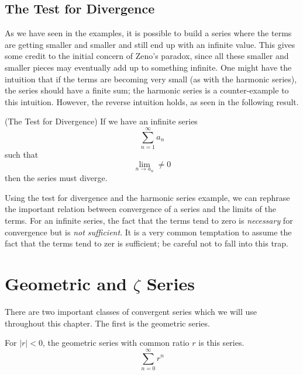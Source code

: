 \documentclass[fleqn]{report}
\begin{document}
\subsection{The Test for Divergence}
\label{test-for-divergence}

As we have seen in the examples, it is possible to
build a series where the terms are getting smaller and smaller
and still end up with an infinite value. This gives some
credit to the initial concern of Zeno's paradox, since all
these smaller and smaller pieces may eventually add up to
something infinite. One might have the intuition that if the
terms are becoming very small (as with the harmonic series),
the series should have a finite sum; the harmonic series is a
counter-example to this intuition. However, the reverse
intuition holds, as seen in the following result.

\begin{prop}(The Test for Divergence)
If we have an infinite series
\begin{equation*}
\sum_{n=1}^\infty a_n
\end{equation*}
such that 
\begin{equation*}
\lim_{n \rightarrow a_n} \neq 0
\end{equation*}
then the series must diverge.
\end{prop} 
Using the test for divergence and the harmonic series example,
we can rephrase the important relation between convergence of
a series and the limits of the terms. For an infinite series,
the fact that the terms tend to zero is \emph{necessary} for
convergence but is \emph{not sufficient}. It is a very common
temptation to assume the fact that the terms tend to zer is
sufficient; be careful not to fall into this trap.

\section{Geometric and $\zeta$ Series}
\label{geometric-zeta}

There are two important classes of convergent series which we
will use throughout this chapter. The first is the geometric
series. 

\begin{defn}
For $|r|<0$, the geometric series with common ratio $r$ is
this series.
\begin{equation*}
\sum_{n=0}^\infty r^n 
\end{equation*}
\end{defn}
\end{document}
